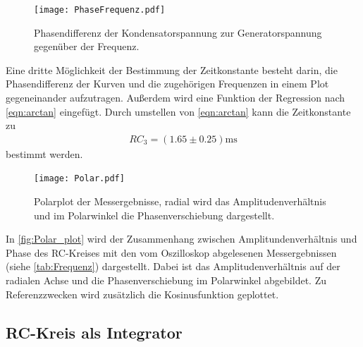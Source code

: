 \begin{figure}[H]
  \centering
  \texttt{[image: PhaseFrequenz.pdf]}
  \caption{Phasendifferenz der Kondensatorspannung zur Generatorspannung gegenüber der Frequenz.}
  \label{fig:PhaseFrequenz_plot}
\end{figure}
\noindent Eine dritte Möglichkeit der Bestimmung der Zeitkonstante besteht darin, die Phasendifferenz der Kurven und die zugehörigen Frequenzen in einem Plot gegeneinander
aufzutragen. Außerdem wird eine Funktion der Regression nach \autoref{eqn:arctan} eingefügt. Durch umstellen von \autoref{eqn:arctan} kann die Zeitkonstante zu
\begin{align*}
  RC_3=(1.65 ± 0.25)\si{\milli\second}
\end{align*}
bestimmt werden.

\begin{figure}[H]
  \centering
  \texttt{[image: Polar.pdf]}
  \caption{Polarplot der Messergebnisse, radial wird das Amplitudenverhältnis und im Polarwinkel die Phasenverschiebung dargestellt.}
  \label{fig:Polar_plot}
\end{figure}
\noindent In \autoref{fig:Polar_plot} wird der Zusammenhang zwischen Amplitundenverhältnis und Phase des RC-Kreises mit den vom Oszilloskop abgelesenen Messergebnissen (siehe \autoref{tab:Frequenz}) dargestellt.
Dabei ist das Amplitudenverhältnis auf der radialen Achse und die Phasenverschiebung im Polarwinkel abgebildet. Zu Referenzzwecken wird zusätzlich die Kosinusfunktion geplottet.

\subsection{RC-Kreis als Integrator} %
\label{sub:Integrator}

